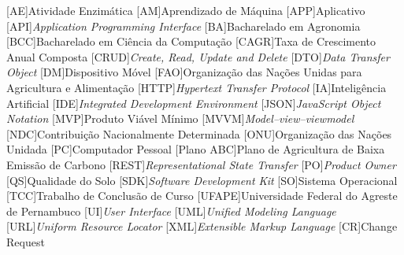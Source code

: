 \begin{acronym}[ACRONYM] 
[AE]{Atividade Enzimática}
[AM]{Aprendizado de Máquina}
[APP]{Aplicativo}
[API]{\textit{Application Programming Interface}}
[BA]{Bacharelado em Agronomia}
[BCC]{Bacharelado em Ciência da Computação}
[CAGR]{Taxa de Crescimento Anual Composta}
[CRUD]{\textit{Create, Read, Update and Delete}}
[DTO]{\textit{Data Transfer Object}}
[DM]{Dispositivo Móvel}
[FAO]{Organização das Nações Unidas para Agricultura e Alimentação}
[HTTP]{\textit{Hypertext Transfer Protocol}}
[IA]{Inteligência Artificial}
[IDE]{\textit{Integrated Development Environment}}
[JSON]{\textit{JavaScript Object Notation}}
[MVP]{Produto Viável Mínimo}
[MVVM]{\textit{Model–view–viewmodel}}
[NDC]{Contribuição Nacionalmente Determinada}
[ONU]{Organização das Nações Unidada}
[PC]{Computador Pessoal}
[Plano ABC]{Plano de Agricultura de Baixa Emissão de Carbono}
[REST]{\textit{Representational State Transfer}}
[PO]{\textit{Product Owner}}
[QS]{Qualidade do Solo}
[SDK]{\textit{Software Development Kit}}
[SO]{Sistema Operacional}
[TCC]{Trabalho de Conclusão de Curso}
[UFAPE]{Universidade Federal do Agreste de Pernambuco}
[UI]{\textit{User Interface}}
[UML]{\textit{Unified Modeling Language}}
[URL]{\textit{Uniform Resource Locator}}
[XML]{\textit{Extensible Markup Language}}
[CR]{Change Request}

\end{acronym}
